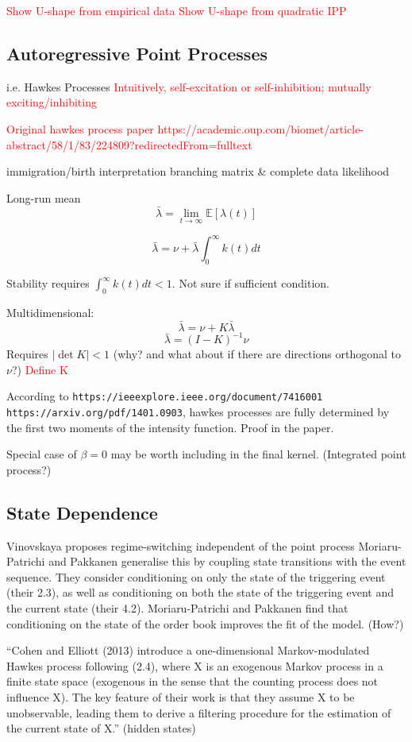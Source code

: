\documentclass[honours,12pt]{unswthesis}
\numberwithin{equation}{section}
\begin{document}
\textcolor{red}{Show U-shape from empirical data}
\textcolor{red}{Show U-shape from quadratic IPP}

\subsection{Autoregressive Point Processes}



i.e. Hawkes Processes
\textcolor{red}{Intuitively, self-excitation or self-inhibition; mutually exciting/inhibiting}

\textcolor{red}{Original hawkes process paper https://academic.oup.com/biomet/article-abstract/58/1/83/224809?redirectedFrom=fulltext}

immigration/birth interpretation
branching matrix \& complete data likelihood

Long-run mean $$\bar\lambda = \lim_{t\to\infty} \mathbb E\left[\lambda(t)\right]$$

$$\bar\lambda = \nu + \bar\lambda \int_0^\infty k(t)dt$$

Stability requires $\int_0^\infty k(t)dt < 1$. Not sure if sufficient condition.

Multidimensional:
$$\bar\lambda = \nu + K \bar\lambda$$
$$\bar\lambda = (I-K)^{-1}\nu$$
Requires $\vert\det K\vert < 1$ (why? and what about if there are directions orthogonal to $\nu$?)
\textcolor{red}{Define K}

According to \texttt{https://ieeexplore.ieee.org/document/7416001 https://arxiv.org/pdf/1401.0903}, hawkes processes are fully determined by the first two moments of the intensity function. Proof in the paper.


Special case of $\beta=0$ may be worth including in the final kernel. (Integrated point process?)


\subsection{State Dependence}
Vinovskaya proposes regime-switching independent of the point process
Moriaru-Patrichi and Pakkanen generalise this by coupling state transitions with the event sequence. They consider conditioning on only the state of the triggering event (their 2.3), as well as conditioning on both the state of the triggering event and the current state (their 4.2).
Moriaru-Patrichi and Pakkanen find that conditioning on the state of the order book improves the fit of the model. (How?)

``Cohen and Elliott (2013) introduce a one-dimensional Markov-modulated Hawkes process following (2.4), where X is an exogenous Markov process in a finite state space (exogenous in the sense that the counting process does not influence X).  The key feature of their work is that they assume X to be unobservable, leading them to derive a filtering procedure for the estimation of the current state of X.'' (hidden states)
\end{document}
